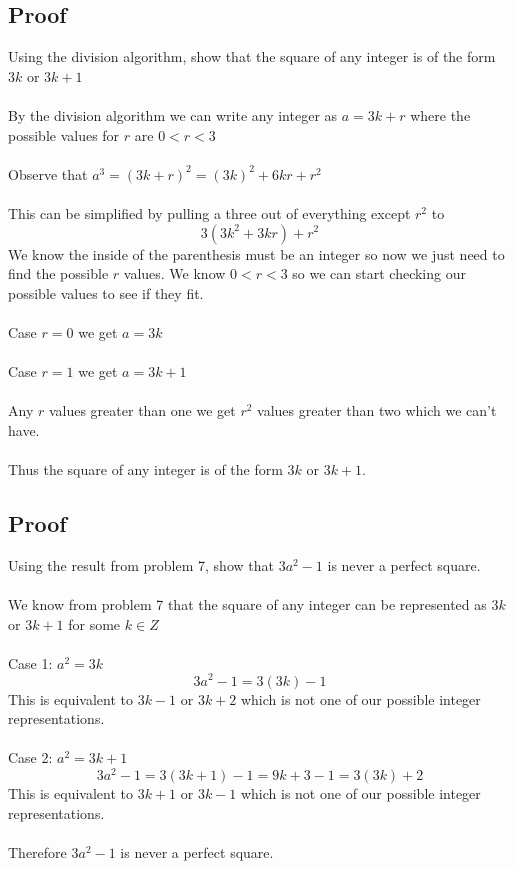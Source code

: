 \documentclass{article}
\begin{document}
\subsection{Proof}
Using the division algorithm, show that the square of any integer is of the form $3k$ or $3k+1$
\\\\
By the division algorithm we can write any integer as $a = 3k + r$ where the possible values for $r$ are $0 < r < 3$\\\\
Observe that $a^3 = (3k + r)^2 = (3k)^2 + 6kr + r^2$\\\\
This can be simplified by pulling a three out of everything except $r^2$ to $$3(3k^2+3kr) + r^2$$
We know the inside of the parenthesis must be an integer so now we just need to find the possible $r$ values. We know $0 < r < 3$ so we can start checking our possible values to see if they fit. 
\\\\
Case $r=0$ we get $a=3k$
\\\\
Case $r=1$ we get $a=3k+1$
\\\\
Any $r$ values greater than one we get $r^2$ values greater than two which we can't have.
\\\\
Thus the square of any integer is of the form $3k$ or $3k+1$.

\subsection{Proof}
Using the result from problem 7, show that $3a^2 - 1$ is never a perfect square.
\\\\
We know from problem 7 that the square of any integer can be represented as $3k$ or $3k+1$ for some $k \in Z$
\\\\
Case 1: $a^2 = 3k$
$$3a^2 - 1 = 3(3k) - 1$$
This is equivalent to $3k - 1$ or $3k+2$ which is not one of our possible integer representations.
\\\\
Case 2: $a^2 = 3k+1$
$$3a^2 - 1 = 3(3k+1) - 1 = 9k+3-1=3(3k) +2$$
This is equivalent to $3k + 1$ or $3k-1$ which is not one of our possible integer representations.\\\\
Therefore $3a^2 - 1$ is never a perfect square.
\end{document}
